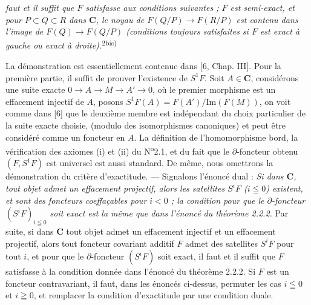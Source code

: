 
\noindent\textit{faut et il suffit que $F$ satisfasse aux conditions suivantes ;
$F$ est semi-exact, et pour $P\subset Q\subset R$ dans $\mathbf{C}$, le noyau de
$F(Q/P)\to F(R/P)$ est contenu dans l'image de
$F(Q)\to F(Q/P)$ (conditions toujours satisfaites si $F$ est
exact à gauche ou exact à droite).}\textsuperscript{2bis)}

La démonstration est essentiellement contenue dans [6, Chap. III]. Pour la
première partie, il suffit de prouver l'existence de $S^1F$. Soit $A\in \mathbf{C}$,
considérons une suite exacte
$0\to A\to M\to A'\to0$, où
le premier morphisme est un effacement injectif de $A$, posons
$S^1F(A)=F(A')/\mathrm{Im}(F(M))$, on voit comme dans [6] que le deuxième
membre est indépendant du choix particulier de la suite exacte choisie,
(modulo des isomorphismes canoniques) et peut être considéré comme un foncteur
en $A$. La définition de l'homomorphisme bord, la vérification des axiomes
(i) et (ii) du N\textsuperscript{o}2.1, et du fait que le
$\partial$-foncteur obtenu $(F,S^1F)$ est universel est aussi standard. De
même, nous omettrons la démonstration du critère d'exactitude.
--- Signalons l'énoncé dual : \textit{Si dans $\mathbf{C}$, tout objet admet un
effacement projectif, alors les satellites $S^iF$ ($i\leqq0$) existent, et
sont des foncteurs coeffaçables pour $i<0$ ; la condition pour que le $\partial$-foncteur
$(S^iF)_{i\leqq0}$ soit exact est la même que dans l'énoncé du théorème \textup{2.2.2}.}
Par suite, si dans $\mathbf{C}$ tout objet admet un effacement injectif et un effacement
projectif, alors tout foncteur covariant additif $F$ admet des satellites
$S^iF$ pour tout $i$, et pour que le $\partial$-foncteur $(S^iF)$
soit exact, il faut et il suffit que $F$ satisfasse à la condition donnée dans
l'énoncé du théorème 2.2.2. Si $F$ est un foncteur contravariant, il faut, dans
les énoncés ci-dessus, permuter les cas $i\leqq0$ et $i\geqq0$, et remplacer la
condition d'exactitude par une condition duale.

